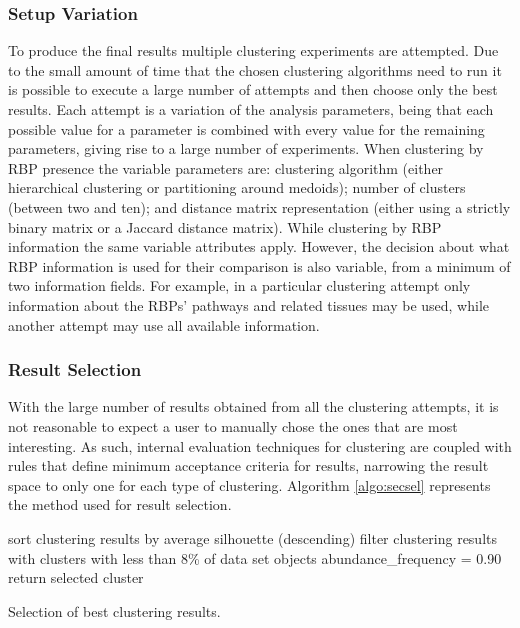 \subsubsection*{Setup Variation}

To produce the final results multiple clustering experiments are attempted. Due
to the small amount of time that the chosen clustering algorithms need to run it
is possible to execute a large number of attempts and then choose only the best
results. Each attempt is a variation of the analysis parameters, being that each
possible value for a parameter is combined with every value for the remaining
parameters, giving rise to a large number of experiments. When clustering by RBP
presence the variable parameters are: clustering algorithm (either hierarchical
clustering or partitioning around medoids); number of clusters (between two and
ten); and distance matrix representation (either using a strictly binary matrix
or a Jaccard distance matrix). While clustering by RBP information the same
variable attributes apply. However, the decision about what RBP information is
used for their comparison is also variable, from a minimum of two information
fields. For example, in a particular clustering attempt only information about
the RBPs' pathways and related tissues may be used, while another attempt may
use all available information.

\subsubsection*{Result Selection}

With the large number of results obtained from all the clustering attempts, it
is not reasonable to expect a user to manually chose the ones that are most
interesting. As such, internal evaluation techniques for clustering are coupled
with rules that define minimum acceptance criteria for results, narrowing the
result space to only one for each type of clustering. Algorithm
\ref{algo:secsel} represents the method used for result selection.

\begin{algorithm}
  \LinesNumbered

  sort clustering results by average silhouette (descending)\;
  filter clustering results with clusters with less than 8\% of data set objects\;
  abundance\_frequency = 0.90\;
   {
    return selected cluster\;
  }

  \caption[Selection of best clustering results]{
    Selection of best clustering results.
  }
  \label{algo:secsel}
\end{algorithm}

